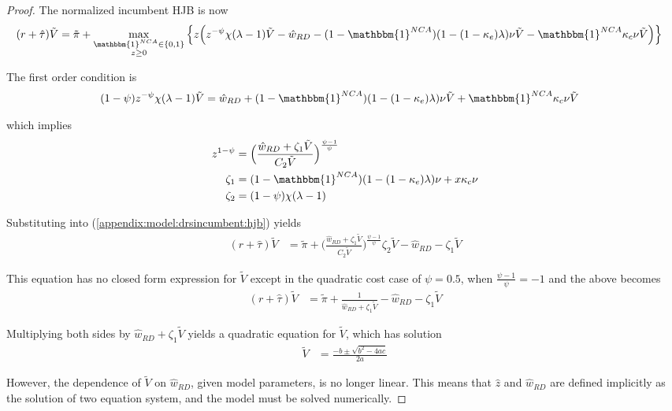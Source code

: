 \documentclass[11pt,english]{article}
\begin{document}
\begin{proof}
	The normalized incumbent HJB is now
	\begin{align}
	(r + \hat{\tau}) \tilde{V} &= \tilde{\pi} + \max_{\substack{\mathbbm{1}^{NCA} \in \{0,1\} \\ z \ge 0}} \Big\{  z \Big( z^{-\psi} \chi (\lambda - 1) \tilde{V} - \hat{w}_{RD} - (1-\mathbbm{1}^{NCA})(1 - (1-\kappa_e) \lambda)\nu \tilde{V} - \mathbbm{1}^{NCA} \kappa_c \nu \tilde{V}  \Big)   \Big\} \label{appendix:model:drsincumbent:hjb}
	\end{align} 
	
	The first order condition is
	\begin{align}
	(1-\psi) z^{-\psi} \chi (\lambda -1)\tilde{V} &= \hat{w}_{RD} + (1-\mathbbm{1}^{NCA}) (1-(1-\kappa_e)\lambda)\nu \tilde{V} + \mathbbm{1}^{NCA} \kappa_c \nu \tilde{V}
	\end{align}
	
	which implies
	\begin{align}
	z^{1-\psi} &= \Big( \frac{\hat{w}_{RD} + \zeta_1\tilde{V}}{C_2\tilde{V}} \Big)^{\frac{\psi -1}{\psi}} \\
	\zeta_1 &= (1-\mathbbm{1}^{NCA})(1-(1-\kappa_e)\lambda)\nu + x\kappa_c\nu \\
	\zeta_2 &= (1-\psi) \chi (\lambda-1)
	\end{align}
	
	Substituting into (\ref{appendix:model:drsincumbent:hjb}) yields
	\begin{align}
	(r + \hat{\tau}) \tilde{V} &= \tilde{\pi} + \Big( \frac{\hat{w}_{RD} + \zeta_1\tilde{V}}{C_2\tilde{V}} \Big)^{\frac{\psi -1}{\psi}} \zeta_2 \tilde{V} - \hat{w}_{RD} - \zeta_1 \tilde{V} 
	\end{align}
	
	This equation has no closed form expression for $\tilde{V}$ except in the quadratic cost case of $\psi = 0.5$, when $\frac{\psi - 1}{\psi} = -1$ and the above becomes
	\begin{align}
	(r + \hat{\tau}) \tilde{V} &= \tilde{\pi} +  \frac{1}{\hat{w}_{RD} + \zeta_1\tilde{V}} - \hat{w}_{RD} - \zeta_1 \tilde{V} 
	\end{align}
	
	Multiplying both sides by $\hat{w}_{RD} + \zeta_1 \tilde{V}$ yields a quadratic equation for $\tilde{V}$, which has solution
	\begin{align}
		\tilde{V} &= \frac{-b \pm \sqrt{b^2 - 4ac}}{2a}
	\end{align}
	
	However, the dependence of $\tilde{V}$ on $\hat{w}_{RD}$, given model parameters, is no longer linear. This means that $\hat{z}$ and $\hat{w}_{RD}$ are defined implicitly as the solution of two equation system, and the model must be solved numerically.	
\end{proof}
\end{document}
